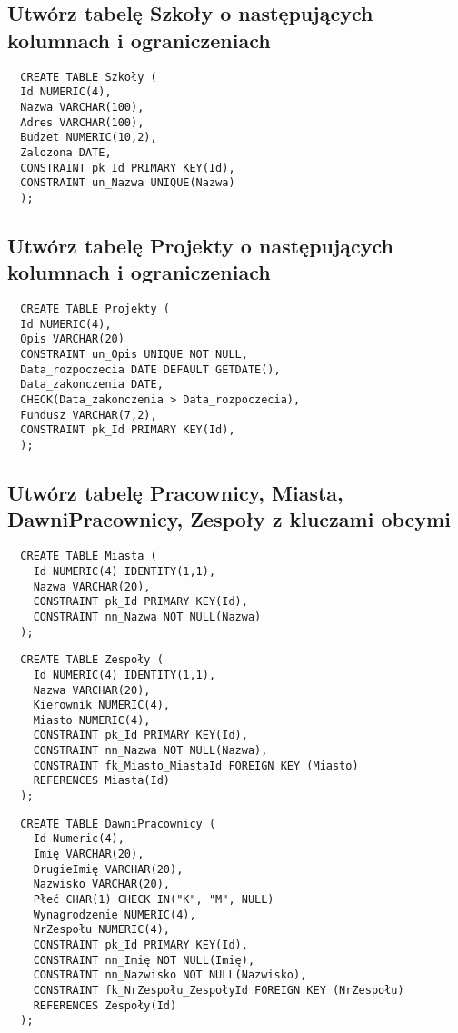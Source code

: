 \documentclass[a4paper]{article}
\begin{document}
\subsection{Utwórz tabelę Szkoły o następujących kolumnach i ograniczeniach}

\begin{verbatim}
  CREATE TABLE Szkoły (
  Id NUMERIC(4),
  Nazwa VARCHAR(100),
  Adres VARCHAR(100),
  Budzet NUMERIC(10,2),
  Zalozona DATE,
  CONSTRAINT pk_Id PRIMARY KEY(Id),
  CONSTRAINT un_Nazwa UNIQUE(Nazwa)
  ); 
\end{verbatim}
\subsection{Utwórz tabelę Projekty o następujących kolumnach i ograniczeniach}

\begin{verbatim}
  CREATE TABLE Projekty (
  Id NUMERIC(4),
  Opis VARCHAR(20)
  CONSTRAINT un_Opis UNIQUE NOT NULL,
  Data_rozpoczecia DATE DEFAULT GETDATE(),
  Data_zakonczenia DATE,
  CHECK(Data_zakonczenia > Data_rozpoczecia),
  Fundusz VARCHAR(7,2),
  CONSTRAINT pk_Id PRIMARY KEY(Id),
  );
\end{verbatim}

\subsection{Utwórz tabelę Pracownicy, Miasta, DawniPracownicy, Zespoły z kluczami obcymi}

\begin{verbatim}
  CREATE TABLE Miasta (
    Id NUMERIC(4) IDENTITY(1,1),
    Nazwa VARCHAR(20),
    CONSTRAINT pk_Id PRIMARY KEY(Id),
    CONSTRAINT nn_Nazwa NOT NULL(Nazwa)
  );
\end{verbatim}

\begin{verbatim}
  CREATE TABLE Zespoły (
    Id NUMERIC(4) IDENTITY(1,1),
    Nazwa VARCHAR(20),
    Kierownik NUMERIC(4),
    Miasto NUMERIC(4),
    CONSTRAINT pk_Id PRIMARY KEY(Id),
    CONSTRAINT nn_Nazwa NOT NULL(Nazwa),
    CONSTRAINT fk_Miasto_MiastaId FOREIGN KEY (Miasto)
    REFERENCES Miasta(Id)
  );
\end{verbatim}

\begin{verbatim}
  CREATE TABLE DawniPracownicy (
    Id Numeric(4),
    Imię VARCHAR(20),
    DrugieImię VARCHAR(20),
    Nazwisko VARCHAR(20),
    Płeć CHAR(1) CHECK IN("K", "M", NULL)
    Wynagrodzenie NUMERIC(4),
    NrZespołu NUMERIC(4),
    CONSTRAINT pk_Id PRIMARY KEY(Id),
    CONSTRAINT nn_Imię NOT NULL(Imię),
    CONSTRAINT nn_Nazwisko NOT NULL(Nazwisko),
    CONSTRAINT fk_NrZespołu_ZespołyId FOREIGN KEY (NrZespołu)
    REFERENCES Zespoły(Id)
  ); 
\end{verbatim}
\end{document}
